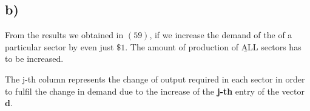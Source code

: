 \documentclass[12pt]{article}
\begin{document}
\subsection{b)}
From the results we obtained in $(59)$, if we increase the demand of the of a particular sector by even just $\$1$. The amount of production of {\b ALL} sectors has to be increased.

The j-th column represents the change of output required in each sector in order to fulfil the change in demand due to the increase of the {\bf j-th} entry of the vector  $\textbf{d}$.
\end{document}
